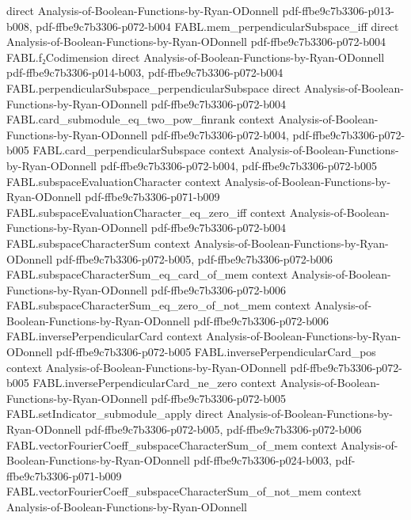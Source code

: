 \begin{theorem}
  {direct}
  {Analysis-of-Boolean-Functions-by-Ryan-ODonnell}
  {pdf-ffbe9c7b3306-p013-b008,
    pdf-ffbe9c7b3306-p072-b004}
\proofstep
  {FABL.mem_perpendicularSubspace_iff}
  {direct}
  {Analysis-of-Boolean-Functions-by-Ryan-ODonnell}
  {pdf-ffbe9c7b3306-p072-b004}
\proofstep
  {FABL.f₂Codimension}
  {direct}
  {Analysis-of-Boolean-Functions-by-Ryan-ODonnell}
  {pdf-ffbe9c7b3306-p014-b003,
    pdf-ffbe9c7b3306-p072-b004}
\proofstep
  {FABL.perpendicularSubspace_perpendicularSubspace}
  {direct}
  {Analysis-of-Boolean-Functions-by-Ryan-ODonnell}
  {pdf-ffbe9c7b3306-p072-b004}
\proofstep
  {FABL.card_submodule_eq_two_pow_finrank}
  {context}
  {Analysis-of-Boolean-Functions-by-Ryan-ODonnell}
  {pdf-ffbe9c7b3306-p072-b004,
    pdf-ffbe9c7b3306-p072-b005}
\proofstep
  {FABL.card_perpendicularSubspace}
  {context}
  {Analysis-of-Boolean-Functions-by-Ryan-ODonnell}
  {pdf-ffbe9c7b3306-p072-b004,
    pdf-ffbe9c7b3306-p072-b005}
\proofstep
  {FABL.subspaceEvaluationCharacter}
  {context}
  {Analysis-of-Boolean-Functions-by-Ryan-ODonnell}
  {pdf-ffbe9c7b3306-p071-b009}
\proofstep
  {FABL.subspaceEvaluationCharacter_eq_zero_iff}
  {context}
  {Analysis-of-Boolean-Functions-by-Ryan-ODonnell}
  {pdf-ffbe9c7b3306-p072-b004}
\proofstep
  {FABL.subspaceCharacterSum}
  {context}
  {Analysis-of-Boolean-Functions-by-Ryan-ODonnell}
  {pdf-ffbe9c7b3306-p072-b005,
    pdf-ffbe9c7b3306-p072-b006}
\proofstep
  {FABL.subspaceCharacterSum_eq_card_of_mem}
  {context}
  {Analysis-of-Boolean-Functions-by-Ryan-ODonnell}
  {pdf-ffbe9c7b3306-p072-b006}
\proofstep
  {FABL.subspaceCharacterSum_eq_zero_of_not_mem}
  {context}
  {Analysis-of-Boolean-Functions-by-Ryan-ODonnell}
  {pdf-ffbe9c7b3306-p072-b006}
\proofstep
  {FABL.inversePerpendicularCard}
  {context}
  {Analysis-of-Boolean-Functions-by-Ryan-ODonnell}
  {pdf-ffbe9c7b3306-p072-b005}
\proofstep
  {FABL.inversePerpendicularCard_pos}
  {context}
  {Analysis-of-Boolean-Functions-by-Ryan-ODonnell}
  {pdf-ffbe9c7b3306-p072-b005}
\proofstep
  {FABL.inversePerpendicularCard_ne_zero}
  {context}
  {Analysis-of-Boolean-Functions-by-Ryan-ODonnell}
  {pdf-ffbe9c7b3306-p072-b005}
\proofstep
  {FABL.setIndicator_submodule_apply}
  {direct}
  {Analysis-of-Boolean-Functions-by-Ryan-ODonnell}
  {pdf-ffbe9c7b3306-p072-b005,
    pdf-ffbe9c7b3306-p072-b006}
\proofstep
  {FABL.vectorFourierCoeff_subspaceCharacterSum_of_mem}
  {context}
  {Analysis-of-Boolean-Functions-by-Ryan-ODonnell}
  {pdf-ffbe9c7b3306-p024-b003,
    pdf-ffbe9c7b3306-p071-b009}
\proofstep
  {FABL.vectorFourierCoeff_subspaceCharacterSum_of_not_mem}
  {context}
  {Analysis-of-Boolean-Functions-by-Ryan-ODonnell}

\end{theorem}
